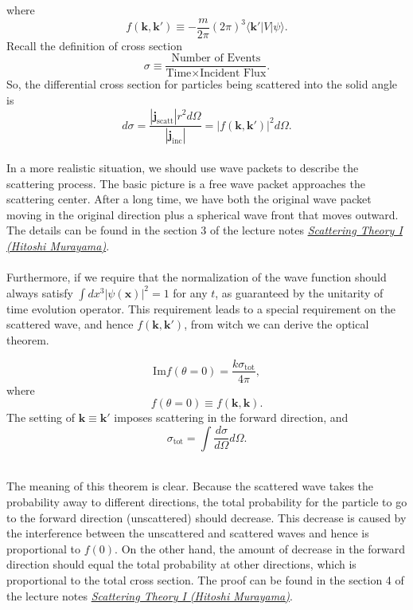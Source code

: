 where
\[f(\bm{k},\bm{k}') \equiv - \frac{m}{2\pi} (2\pi)^3  \langle \bm{k}'| V | \psi\rangle .\]
Recall the definition of cross section
\[\sigma \equiv \frac{\mbox{Number of Events}}{\mbox{Time} \times \mbox{Incident Flux}}.\]
So, the differential cross section for particles being scattered into the solid angle is
\[d\sigma = \frac{|\bm{j}_{\mathrm{scatt}}| r^2 d\Omega}{|\bm{j}_{\mathrm{inc}}|} = |f(\bm{k},\bm{k}')|^2 d\Omega.\]
\\
In a more realistic situation, we should use wave packets to describe the scattering process. The basic picture is a free wave packet approaches the scattering center. After a long time, we have both the original wave packet moving in the original direction plus a spherical wave front that moves outward. The details can be found in the section 3 of the lecture notes 
\href{http://hitoshi.berkeley.edu/221B/index.html}{\emph{Scattering Theory I (Hitoshi Murayama)}}.
\\ \\
Furthermore, if we require that the normalization of the wave function should always satisfy $\int dx^3 |\psi(\bm{x})|^2 = 1$ for any $t$, as guaranteed by the unitarity of time evolution operator. This requirement leads to a special requirement on the scattered wave, and hence $f(\bm{k},\bm{k}')$, from witch we can derive the optical theorem.\\

\begin{newthem}
\[\mathrm{Im} f(\theta = 0) = \frac{k\sigma_{\mathrm{tot}}}{4\pi},\]
where
\[f(\theta = 0) \equiv f(\bm{k},\bm{k}).\]
The setting of $\bm{k} \equiv \bm{k}'$ imposes scattering in the forward direction, and
\[\sigma_{\mathrm{tot}} = \int \frac{d\sigma}{d\Omega} d\Omega.\]
\end{newthem}
\noindent
\\
The meaning of this theorem is clear. Because the scattered wave takes the probability away to different directions, the total probability for the particle to go to the forward direction (unscattered) should decrease. This decrease is caused by the interference between the unscattered and scattered waves and hence is proportional to $f(0)$. On the other hand, the amount of decrease in the forward direction should equal the total probability at other directions, which is proportional to the total cross section. The proof can be found in the section 4 of the lecture notes \href{http://hitoshi.berkeley.edu/221B/index.html}{\emph{Scattering Theory I (Hitoshi Murayama)}}.

